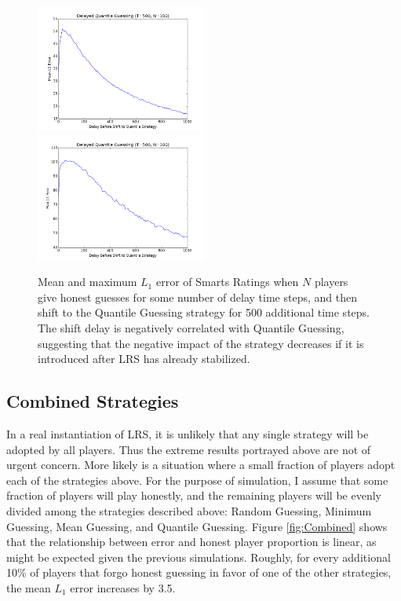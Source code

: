 \begin{figure}[H]
\centerline{%
\includegraphics[width=0.5\textwidth]{figures/robustness/Delayed_Quantile_Guessing41.png}%
\includegraphics[width=0.5\textwidth] {figures/robustness/Delayed_Quantile_Guessing42.png}%
}%
\caption{Mean and maximum $L_1$ error of Smarts Ratings when $N$ players give honest guesses for some number of delay time steps, and then shift to the Quantile Guessing strategy for 500 additional time steps. The shift delay is negatively correlated with Quantile Guessing, suggesting that the negative impact of the strategy decreases if it is introduced after LRS has already stabilized.}
\label{fig:QuantileGuessDelay}
\end{figure}

\subsection{Combined Strategies}

In a real instantiation of LRS, it is unlikely that any single strategy will be adopted by all players. Thus the extreme results portrayed above are not of urgent concern. More likely is a situation where a small fraction of players adopt each of the strategies above. For the purpose of simulation, I assume that some fraction of players will play honestly, and the remaining players will be evenly divided among the strategies described above: Random Guessing, Minimum Guessing, Mean Guessing, and Quantile Guessing. Figure \ref{fig:Combined} shows that the relationship between error and honest player proportion is linear, as might be expected given the previous simulations. Roughly, for every additional 10\% of players that forgo honest guessing in favor of one of the other strategies, the mean $L_1$ error increases by 3.5.

